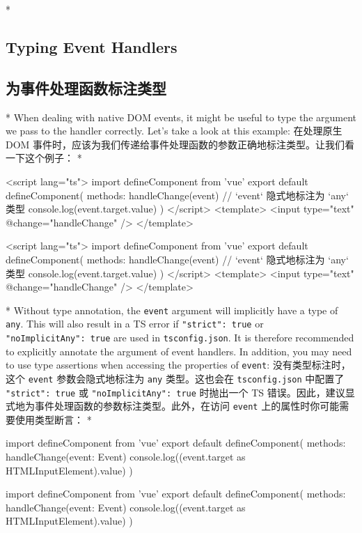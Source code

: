 \begin{paracol}{2} 
 
\switchcolumn[0]*%
\subsection{Typing Event Handlers}
\switchcolumn
\subsection{为事件处理函数标注类型}
\switchcolumn[0]*%
When dealing with native DOM events, it might be useful to type the
argument we pass to the handler correctly. Let's take a look at this
example:
\switchcolumn
在处理原生 DOM
事件时，应该为我们传递给事件处理函数的参数正确地标注类型。让我们看一下这个例子：
\switchcolumn[0]*%
\begin{codeHtml}
<script lang="ts">
import { defineComponent } from 'vue'
export default defineComponent({
  methods: {
    handleChange(event) {
      // `event` 隐式地标注为 `any` 类型
      console.log(event.target.value)
    }
  }
})
</script>
<template>
  <input type="text" @change="handleChange" />
</template>
\end{codeHtml}
\switchcolumn
\begin{codeHtml}
<script lang="ts">
import { defineComponent } from 'vue'
export default defineComponent({
  methods: {
    handleChange(event) {
      // `event` 隐式地标注为 `any` 类型
      console.log(event.target.value)
    }
  }
})
</script>
<template>
  <input type="text" @change="handleChange" />
</template>
\end{codeHtml}
\switchcolumn[0]*%
Without type annotation, the \texttt{event} argument will implicitly
have a type of \texttt{any}. This will also result in a TS error if
\texttt{"strict":\ true} or \texttt{"noImplicitAny":\ true} are used in
\texttt{tsconfig.json}. It is therefore recommended to explicitly
annotate the argument of event handlers. In addition, you may need to
use type assertions when accessing the properties of \texttt{event}:
\switchcolumn
没有类型标注时，这个 \texttt{event} 参数会隐式地标注为 \texttt{any}
类型。这也会在 \texttt{tsconfig.json} 中配置了 \texttt{"strict":\ true}
或 \texttt{"noImplicitAny":\ true} 时抛出一个 TS
错误。因此，建议显式地为事件处理函数的参数标注类型。此外，在访问
\texttt{event} 上的属性时你可能需要使用类型断言：
\switchcolumn[0]*%
\begin{codeTs}
import { defineComponent } from 'vue'
export default defineComponent({
  methods: {
    handleChange(event: Event) {
      console.log((event.target as HTMLInputElement).value)
    }
  }
})
\end{codeTs}
\switchcolumn
\begin{codeTs}
import { defineComponent } from 'vue'
export default defineComponent({
  methods: {
    handleChange(event: Event) {
      console.log((event.target as HTMLInputElement).value)
    }
  }
})
\end{codeTs}
\end{paracol}


